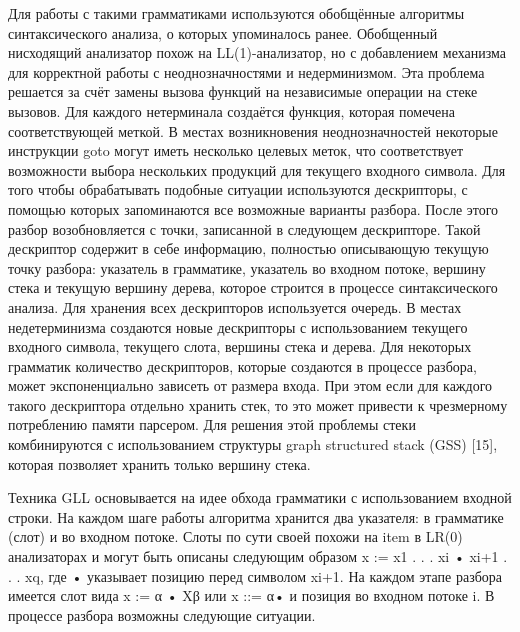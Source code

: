 Для работы с такими грамматиками используются обобщённые алгоритмы синтаксического анализа, о которых упоминалось ранее. Обобщенный нисходящий анализатор похож на LL(1)-анализатор, но с добавлением механизма для корректной работы с неоднозначностями и недерминизмом. Эта проблема решается за счёт замены вызова функций на независимые операции на стеке вызовов. Для каждого нетерминала создаётся функция, которая помечена соответствующей меткой. В местах возникновения неоднозначностей некоторые инструкции goto могут иметь несколько целевых меток, что соответствует возможности выбора нескольких продукций для текущего входного символа. Для того чтобы обрабатывать подобные ситуации используются дескрипторы, с помощью которых запоминаются все возможные варианты разбора. После этого разбор возобновляется с точки, записанной в следующем дескрипторе. Такой дескриптор  содержит в себе информацию, полностью описывающую текущую точку разбора: указатель в грамматике, указатель во входном потоке, вершину стека и текущую вершину дерева, которое строится в процессе синтаксического анализа. Для хранения всех дескрипторов используется очередь. В местах недетерминизма создаются новые дескрипторы с использованием текущего входного символа, текущего слота, вершины стека и дерева. Для некоторых грамматик количество дескрипторов, которые создаются в процессе разбора, может экспоненциально зависеть от размера входа. При этом если для каждого такого дескриптора отдельно хранить стек, то это может привести к чрезмерному потреблению памяти парсером. Для решения этой проблемы стеки комбинируются с использованием структуры graph structured stack (GSS) [15], которая позволяет хранить только вершину стека.

Техника GLL основывается на идее обхода грамматики с использованием входной строки. На каждом шаге работы алгоритма хранится два указателя: в грамматике (слот) и во входном потоке. Слоты по сути своей похожи на item в  LR(0) анализаторах и могут быть описаны следующим образом x := x1 . . . xi • xi+1 . . . xq, где • указывает позицию перед символом xi+1. На каждом этапе разбора имеется слот вида x := α • Xβ или x ::= α• и позиция во входном потоке i. В процессе разбора возможны следующие ситуации.

